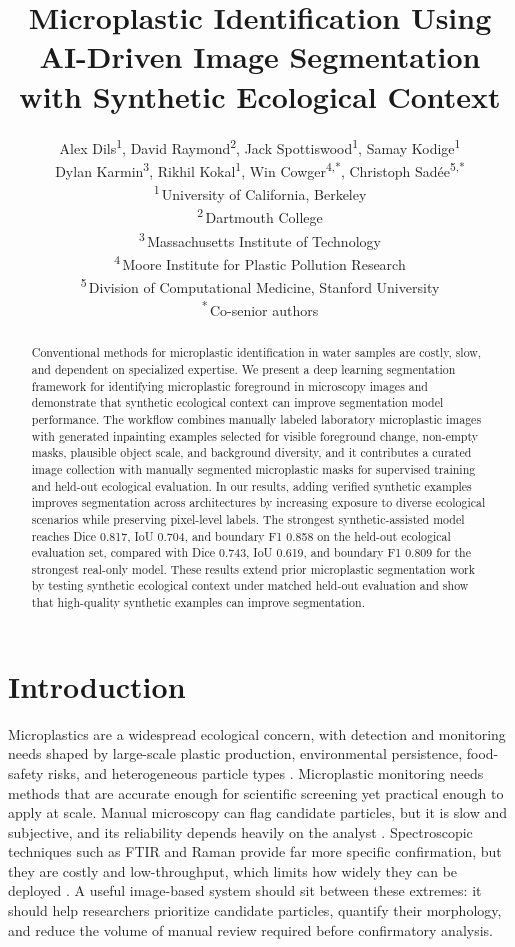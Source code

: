 \documentclass[11pt]{article}
\title{Microplastic Identification Using AI-Driven Image Segmentation with Synthetic Ecological Context}
\author{Alex Dils\textsuperscript{1}, David Raymond\textsuperscript{2}, Jack Spottiswood\textsuperscript{1}, Samay Kodige\textsuperscript{1}\\
Dylan Karmin\textsuperscript{3}, Rikhil Kokal\textsuperscript{1}, Win Cowger\textsuperscript{4,*}, Christoph Sadée\textsuperscript{5,*}\\[0.35em]
\small \textsuperscript{1}\,University of California, Berkeley\\
\small \textsuperscript{2}\,Dartmouth College\\
\small \textsuperscript{3}\,Massachusetts Institute of Technology\\
\small \textsuperscript{4}\,Moore Institute for Plastic Pollution Research\\
\small \textsuperscript{5}\,Division of Computational Medicine, Stanford University\\
\small \textsuperscript{*}\,Co-senior authors}
\date{}
\begin{document}
\maketitle
\begin{abstract}
Conventional methods for microplastic identification in water samples are costly, slow, and dependent on specialized expertise. We present a deep learning segmentation framework for identifying microplastic foreground in microscopy images and demonstrate that synthetic ecological context can improve segmentation model performance. The workflow combines manually labeled laboratory microplastic images with generated inpainting examples selected for visible foreground change, non-empty masks, plausible object scale, and background diversity, and it contributes a curated image collection with manually segmented microplastic masks for supervised training and held-out ecological evaluation. In our results, adding verified synthetic examples improves segmentation across architectures by increasing exposure to diverse ecological scenarios while preserving pixel-level labels. The strongest synthetic-assisted model reaches Dice 0.817, IoU 0.704, and boundary F1 0.858 on the held-out ecological evaluation set, compared with Dice 0.743, IoU 0.619, and boundary F1 0.809 for the strongest real-only model. These results extend prior microplastic segmentation work by testing synthetic ecological context under matched held-out evaluation and show that high-quality synthetic examples can improve segmentation.
\end{abstract}

\section{Introduction}
Microplastics are a widespread ecological concern, with detection and monitoring needs shaped by large-scale plastic production, environmental persistence, food-safety risks, and heterogeneous particle types \cite{1,6,7}. Microplastic monitoring needs methods that are accurate enough for scientific screening yet practical enough to apply at scale. Manual microscopy can flag candidate particles, but it is slow and subjective, and its reliability depends heavily on the analyst \cite{2,3,7}. Spectroscopic techniques such as FTIR and Raman provide far more specific confirmation, but they are costly and low-throughput, which limits how widely they can be deployed \cite{2,3,7}. A useful image-based system should sit between these extremes: it should help researchers prioritize candidate particles, quantify their morphology, and reduce the volume of manual review required before confirmatory analysis.
\end{document}
